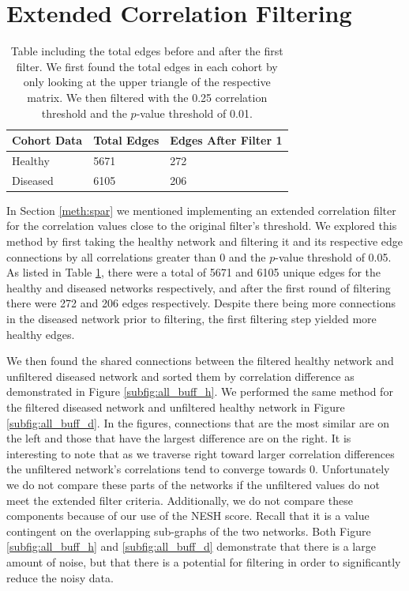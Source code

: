 \section{Extended Correlation Filtering}\label{sec-res-buff}
\begin{table}[hbt]
\centering
\begin{tabular}{p{3cm} p{3cm} p{4cm}}
    \toprule
    Cohort Data & Total Edges & Edges After Filter 1 \\ 
    \midrule
    Healthy & 5671 & 272 \\ 
    Diseased & 6105 & 206 \\ 
   \bottomrule
\end{tabular}
\caption[Table including the total edges before and after the first filter.]{Table including the total edges before and after the first filter. We first found the total edges in each cohort by only looking at the upper triangle of the respective matrix. We then filtered with the 0.25 correlation threshold and the $p$-value threshold of 0.01. }
\label{tab:edge_table1}
\end{table}
In Section \ref{meth:spar} we mentioned implementing an extended correlation filter for the correlation values close to the original filter's threshold. We explored this method by first taking the healthy network and filtering it and its respective edge connections by all correlations greater than 0 and the $p$-value threshold of 0.05. As listed in Table \ref{tab:edge_table1}, there were a total of 5671 and 6105 unique edges for the healthy and diseased networks respectively, and after the first round of filtering there were 272 and 206 edges respectively. Despite there being more connections in the diseased network prior to filtering, the first filtering step yielded more healthy edges.

We then found the shared connections between the filtered healthy network and unfiltered diseased network and sorted them by correlation difference as demonstrated in Figure \ref{subfig:all_buff_h}. We performed the same method for the filtered diseased network and unfiltered healthy network in Figure \ref{subfig:all_buff_d}. In the figures, connections that are the most similar are on the left and those that have the largest difference are on the right. It is interesting to note that as we traverse right toward larger correlation differences the unfiltered network's correlations tend to converge towards 0. Unfortunately we do not compare these parts of the networks if the unfiltered values do not meet the extended filter criteria. Additionally, we do not compare these components because of our use of the \acrshort{NESH} score. Recall that it is a value contingent on the overlapping sub-graphs of the two networks. Both Figure \ref{subfig:all_buff_h} and \ref{subfig:all_buff_d} demonstrate that there is a large amount of noise, but that there is a potential for filtering in order to significantly reduce the noisy data. 

